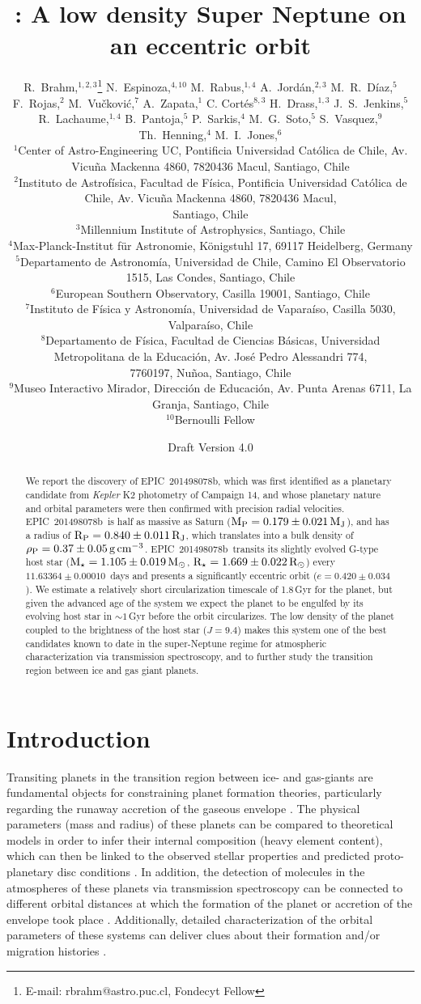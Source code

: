 \documentclass[useAMS,usenatbib]{mnras}
\title[\stname]{\plname: A low density Super Neptune
on an eccentric orbit}
\author[R. Brahm et al.]{R.\ Brahm,$^{1,2,3}$\thanks{E-mail: rbrahm@astro.puc.cl, Fondecyt Fellow}
                    N.\ Espinoza,$^{4,10}$                     
                    M.\ Rabus,$^{1,4}$  
                    A.\ Jord\'an,$^{2,3}$
                    M.~R.\ D\'iaz,$^{5}$ 
                    F.\ Rojas,$^{2}$ 
		            \newauthor
                    M.\ Vu\v{c}kovi\'{c},$^{7}$  
					A.\ Zapata,$^{1}$
                    C. Cort\'es$^{8,3}$
                    H.\ Drass,$^{1,3}$
					J.~S.\ Jenkins,$^{5}$
					R.\ Lachaume,$^{1,4}$
                    \newauthor
                    B.\ Pantoja,$^{5}$
                    P.\ Sarkis,$^{4}$
 					M.~G.\ Soto,$^{5}$                 
 					S.\ Vasquez,$^{9}$                        
                    Th.\ Henning,$^{4}$                    
                    M.~I.\ Jones,$^{6}$                    
\\
$^{1}$Center of Astro-Engineering UC, Pontificia Universidad Cat\'olica de Chile, Av. Vicu\~{n}a Mackenna 4860, 7820436 Macul, Santiago, Chile\\
$^{2}$Instituto de Astrof\'isica, Facultad de F\'isica, Pontificia Universidad Cat\'olica de Chile, Av. Vicu\~{n}a Mackenna 4860, 7820436 Macul,\\
Santiago, Chile\\
$^{3}$Millennium Institute of Astrophysics, Santiago, Chile\\
$^{4}$Max-Planck-Institut f\"{u}r Astronomie, K\"{o}nigstuhl 17, 69117 Heidelberg, Germany\\
$^{5}$Departamento de Astronom\'ia, Universidad de Chile, Camino El Observatorio 1515, Las Condes, Santiago, Chile\\
$^{6}$European Southern Observatory, Casilla 19001, Santiago, Chile\\
$^{7}$Instituto de F\'isica y Astronom\'ia, Universidad de Vapara\'iso, Casilla 5030, Valpara\'iso, Chile\\
$^{8}$Departamento de F\'isica, Facultad de Ciencias B\'asicas, Universidad  Metropolitana  de  la  Educaci\'on, Av. Jos\'e  Pedro Alessandri 774,\\
7760197, Nu\~noa, Santiago, Chile\\
$^{9}$Museo Interactivo Mirador, Dirección de Educación, Av. Punta Arenas 6711, La Granja, Santiago, Chile\\
$^{10}$Bernoulli Fellow\\
}
\newcommand{\mjup}{\ensuremath{{\rm M_{J}}}}
\newcommand{\mpl}{\ensuremath{{\rm M_P}}}
\newcommand{\rjup}{\ensuremath{{\rm R_J}}}
\newcommand{\rpl}{\ensuremath{{\rm R_P}}}
\newcommand{\rstar}{\ensuremath{{\rm R}_{\star}}}
\newcommand{\mstar}{\ensuremath{{\rm M}_{\star}}}
\newcommand{\rsun}{\ensuremath{{\rm R}_{\odot}}}
\newcommand{\msun}{\ensuremath{{\rm M}_{\odot}}}
\newcommand{\mpkep}{\ensuremath{0.179 \pm 0.021 }}
\newcommand{\rpkep}{\ensuremath{0.840 \pm 0.011 }}
\newcommand{\mskep}{\ensuremath{1.105 \pm 0.019 }}
\newcommand{\rskep}{\ensuremath{1.669 \pm 0.022 }}
\newcommand{\per}{\ensuremath{11.63364 \pm 0.00010 }}
\newcommand{\ecc}{\ensuremath{0.420 \pm 0.034 }}
\newcommand{\plname}{EPIC~201498078b}
\newcommand{\rhopl}{\ensuremath{{\rm \rho_P}}}
\newcommand{\rhopkep}{\ensuremath{0.37 \pm 0.05 }}
\newcommand{\gccm}{\ensuremath{\mathrm{g}\,\mathrm{cm}^{-3}}}
\begin{document}
\date{Draft Version 4.0}

\pagerange{\pageref{firstpage}--\pageref{lastpage}} 

\maketitle

\label{firstpage}

\begin{abstract}
We report the discovery of \plname, which was first identified
as a planetary candidate from \textit{Kepler} K2 photometry of Campaign 14,
and whose planetary nature and orbital parameters were then confirmed
with precision radial velocities.
\plname\ is half as massive as Saturn ($\mpl = \mpkep\,\mjup$),
and has a radius of $\rpl= \rpkep\,\rjup$, which translates into a bulk density of
$\rhopl =\rhopkep\,\gccm$.
\plname\ transits its slightly evolved G-type host star ($\mstar = \mskep\,\msun$, $\rstar = \rskep\,\rsun$) every \per\ days and presents a significantly eccentric orbit ($e=\ecc$).
We estimate a relatively short circularization timescale of 1.8\,Gyr for the planet, but
given the advanced age of the system we expect the planet to be engulfed by its evolving
host star in $\sim 1$\,Gyr before the orbit circularizes. 
The low density of the planet coupled to the brightness of the host star
($J=9.4$) makes this system one of the best candidates known to date in the
super-Neptune regime for atmospheric characterization via transmission spectroscopy, and to further study the transition region between ice and gas giant planets.


\end{abstract}

\begin{keywords}
\end{keywords}

\section{Introduction}
\label{sec:intro}

Transiting planets in the transition region between ice- and gas-giants \citep[super Neptunes, e.g.][]{hats8b} are fundamental objects for constraining planet formation theories,
particularly regarding the runaway accretion of the gaseous
envelope \citep{ida:2004,mordasini:2009}.
The physical parameters (mass and radius) of these planets can be
compared to theoretical models in order to infer their internal composition
(heavy element content), which can then be linked to the observed stellar
properties and predicted proto-planetary disc conditions \citep{thorngren:2016}.
In addition, the detection of molecules in the atmospheres of these planets
via transmission spectroscopy can be connected to different orbital distances at
which the formation of the planet or accretion of the envelope took place
\citep{mordasini:2016,Espinoza:2017}.
Additionally, detailed characterization of the orbital parameters of these
systems can deliver clues about their formation and/or migration histories
\citep{dawson:2013,petrovich:2016}.
\end{document}
